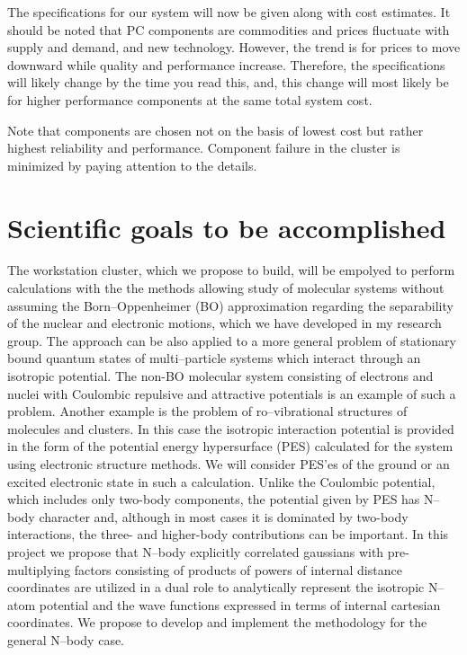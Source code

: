 The specifications for our system will now be given along with cost estimates.
It should be noted that PC components are commodities and prices fluctuate
with supply and demand, and new technology. However, the trend is for prices
to move downward while quality and performance increase. Therefore, the
specifications will likely change by the time you read this, and, this change
will most likely be for higher performance components at the same total system cost.

Note that components are chosen not on the basis of lowest cost but rather
highest reliability and performance. Component failure in the cluster is
minimized by paying attention to the details.%


\section{Scientific goals to be accomplished}



The workstation cluster, which we propose to build, will
be empolyed to perform calculations with the 
the methods allowing study of molecular systems without
assuming the Born--Oppenheimer (BO) approximation regarding the
separability of the nuclear and electronic motions, which we have
developed in my research group.\cite{1,2,3,4}
The approach can be also applied to 
a more general problem of stationary bound
quantum states of multi--particle
systems which interact through an isotropic potential.
The non-BO molecular system consisting of electrons and nuclei 
with
Coulombic repulsive and attractive potentials 
is an example of such a problem.
Another example
is the problem of ro--vibrational structures
of molecules and clusters. 
In this case the isotropic interaction potential is provided
in the form of the potential energy hypersurface (PES)
calculated for the system using electronic structure methods.
We will consider PES'es of the 
ground or an excited electronic state in such a calculation.
Unlike the Coulombic potential, which includes only two-body
components, the potential given by PES has N--body character and,
although in most cases it is dominated by two-body interactions,
the three- and higher-body contributions can be important.
In this project we propose that N--body
explicitly correlated gaussians with pre-multiplying factors consisting of
products of powers of internal distance coordinates are utilized in a dual
role to analytically represent the isotropic N--atom potential and the 
wave functions expressed in terms of internal cartesian coordinates. 
We propose to develop and implement the methodology for the general
N--body case. 

